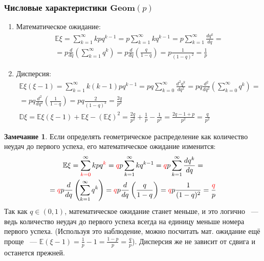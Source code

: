 \documentclass[oneside,final,14pt]{extreport}
\theoremstyle{plain}
\theoremstyle{definition}
\newtheorem*{rmrk}{Замечание}
\theoremstyle{named}
\begin{document}
\subsubsection{Числовые характеристики $\mathbf{Geom}(p)$}
\begin{enumerate}
    \item Математическое ожидание:
    \begin{multline*}
        \mathbb{E} \xi=\sum\limits_{k=1}^{\infty} k p q^{k-1}=p \sum\limits_{k=1}^{\infty} k q^{k-1}=p \sum\limits_{k=1}^{\infty} \frac{d q^{k}}{d q} = \\
        = p \frac{d}{d q}\left(\sum\limits_{k=1}^{\infty} q^{k}\right)=p \frac{d}{d q}\left(\frac{q}{1-q}\right)=p \frac{1}{(1-q)^{2}}=\frac{1}{p}
    \end{multline*}
    \item Дисперсия:
    \begin{multline*}
        \mathbb{E} \xi(\xi-1)=\sum\limits_{k=1}^{\infty} k(k-1) p q^{k-1}=p q \sum\limits_{k=0}^{\infty} \frac{d^{2} q^{k}}{d q^{2}} =p q \frac{d^{2}}{d q^{2}}\left(\sum\limits_{k=0}^{\infty} q^{k}\right) = \\
        =p q \frac{d^{2}}{d q^{2}}\left(\frac{1}{1-q}\right)=p q \frac{2}{(1-q)^{3}}=\frac{2 q}{p^{2}} \\
        \mathbb{D} \xi=\mathbb{E} \xi(\xi-1)+\mathbb{E} \xi-(\mathbb{E} \xi)^{2}=\frac{2 q}{p^{2}}+\frac{1}{p}-\frac{1}{p^{2}}=\frac{2 q-1+p}{p^{2}}=\frac{q}{p^{2}}
    \end{multline*}
\end{enumerate}

\begin{rmrk}
    Если определять геометрическое распределение как количество неудач до первого успеха, его математическое ожидание изменится:
    \begin{multline*}
        \mathbb{E} \xi=\sum\limits^{\infty}_{\color{red}k=0} k p q^{\color{red}k}= {\color{red}q}p \sum\limits_{k=1}^{\infty} k q^{k-1}= {\color{red}q}p \sum\limits_{k=1}^{\infty} \frac{d q^{k}}{d q} = \\
        = {\color{red}q}p \frac{d}{d q}\left(\sum\limits_{k=1}^{\infty} q^{k}\right)={\color{red}q} p \frac{d}{d q}\left(\frac{q}{1-q}\right)= {\color{red}q}p \frac{1}{(1-q)^{2}}=\frac{{\color{red}q}}{p}
    \end{multline*}
    Так как $q \in (0,1)$, математическое ожидание станет меньше, и это логично ~--- ведь количество неудач до первого успеха всегда на единицу меньше номера первого успеха. (Используя это наблюдение, можно посчитать мат. ожидание ещё проще ~--- $\mathbb{E}(\xi - 1) = \frac{1}{p} - 1 = \frac{1-p}{p} = \frac{q}{p}$). Дисперсия же не зависит от сдвига и останется прежней.
\end{rmrk}
\end{document}
